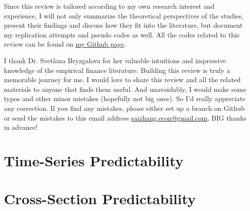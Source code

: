 \documentclass[12pt,openany]{report}
\begin{document}
Since this review is tailored according to my own research interest and
experience, I will not only summarize the theoretical perspectives of the
studies, present their findings and discuss how they fit into the literature,
but document my replication attempts and pseudo codes as well. All the codes related
to this review can be found on \href{https://github.com/SaiChrisZHANG}{my Github page}.

I thank Dr. Svetlana Bryzgalova for her valuable intuitions and impressive
knowledge of the empirical finance literature. Building this review is truly
a memorable journey for me. I would love to share this review and all the related
materials to anyone that finds them useful. And unavoidably, I would make some
typos and other minor mistakes (hopefully not big ones). So I'd really appreciate
any correction. If you find any mistakes, please either set up a branch on Github
or send the mistakes to this email address 
\href{mailto:saizhang.econ@gmail.com}{saizhang.econ@gmail.com}, BIG thanks in advance!

\newpage

\dominitoc
\tableofcontents

\chapter{Time-Series Predictability}


\chapter{Cross-Section Predictability}


\newpage


\end{document}
